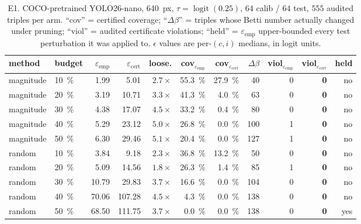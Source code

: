 \documentclass[11pt]{article}
\newcommand{\epscert}{\varepsilon_{\mathrm{cert}}}
\newcommand{\epsemp}{\varepsilon_{\mathrm{emp}}}
\newcommand{\Betti}{\beta}
\theoremstyle{definition}
\theoremstyle{plain}
\begin{document}
\begin{table}[t]
\centering
\caption{E1. COCO-pretrained YOLO26-nano, \SI{640}{px}, $\tau =
\operatorname{logit}(0.25)$, $64$ calib / $64$ test, $555$ audited triples per
arm. ``cov'' = certified coverage; ``$\Delta\Betti$'' = triples whose Betti
number actually changed under pruning; ``viol'' = audited certificate violations;
``held'' = $\epsemp$ upper-bounded every test perturbation it was applied to.
$\epsilon$ values are per-$(c,i)$ medians, in logit units.}
\label{tab:e1}
\small
\setlength{\tabcolsep}{4.5pt}
\begin{tabular}{@{}llrrrrrrrrr@{}}
\toprule
method & budget & $\epsemp$ & $\epscert$ & loose. &
cov$_{\epsemp}$ & cov$_{\epscert}$ & $\Delta\Betti$ &
viol$_{\epsemp}$ & viol$_{\epscert}$ & held \\
\midrule
magnitude & \SI{10}{\percent} & 1.99 & 5.01  & $2.7\times$ & \SI{55.3}{\percent} & \SI{27.9}{\percent} & 40  & 0 & \textbf{0} & no \\
magnitude & \SI{20}{\percent} & 3.19 & 10.71 & $3.3\times$ & \SI{41.3}{\percent} & \SI{4.0}{\percent}  & 63  & 0 & \textbf{0} & no \\
magnitude & \SI{30}{\percent} & 4.38 & 17.07 & $4.5\times$ & \SI{33.2}{\percent} & \SI{0.4}{\percent}  & 80  & 0 & \textbf{0} & no \\
magnitude & \SI{40}{\percent} & 5.29 & 23.12 & $5.0\times$ & \SI{26.8}{\percent} & \SI{0.0}{\percent}  & 100 & 1 & \textbf{0} & no \\
magnitude & \SI{50}{\percent} & 6.30 & 29.46 & $5.1\times$ & \SI{20.4}{\percent} & \SI{0.0}{\percent}  & 127 & 1 & \textbf{0} & no \\
\midrule
random & \SI{10}{\percent} & 3.84  & 9.18   & $2.3\times$ & \SI{36.8}{\percent} & \SI{13.2}{\percent} & 50  & 0 & \textbf{0} & no \\
random & \SI{20}{\percent} & 5.09  & 14.56  & $1.8\times$ & \SI{26.3}{\percent} & \SI{1.4}{\percent}  & 85  & 1 & \textbf{0} & no \\
random & \SI{30}{\percent} & 10.79 & 29.83  & $3.7\times$ & \SI{16.6}{\percent} & \SI{0.0}{\percent}  & 104 & 0 & \textbf{0} & no \\
random & \SI{40}{\percent} & 70.06 & 107.28 & $4.5\times$ & \SI{4.3}{\percent}  & \SI{0.0}{\percent}  & 138 & 0 & \textbf{0} & no \\
random & \SI{50}{\percent} & 68.50 & 111.75 & $3.7\times$ & \SI{0.0}{\percent}  & \SI{0.0}{\percent}  & 138 & 0 & \textbf{0} & yes \\
\bottomrule
\end{tabular}
\end{table}
\end{document}
